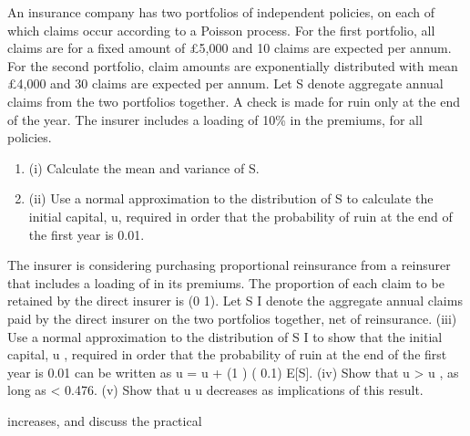 \documentclass[a4paper,12pt]{article}
\begin{document}
\item An insurance company has two portfolios of independent policies, on each of which claims occur according to a Poisson process. For the first portfolio, all claims are for a fixed amount of £5,000 and 10 claims are expected per annum. For the second
portfolio, claim amounts are exponentially distributed with mean £4,000 and 30
claims are expected per annum.
Let S denote aggregate annual claims from the two portfolios together.
A check is made for ruin only at the end of the year.
The insurer includes a loading of 10\% in the premiums, for all policies.
\begin{enumerate}
\item (i) Calculate the mean and variance of S. 
\item (ii) Use a normal approximation to the distribution of S to calculate the initial capital, u, required in order that the probability of ruin at the end of the first year is 0.01. 
\end{enumerate}
\item The insurer is considering purchasing proportional reinsurance from a reinsurer that includes a loading of in its premiums. The proportion of each claim to be retained by the direct insurer is (0
1).
Let S I denote the aggregate annual claims paid by the direct insurer on the two portfolios together, net of reinsurance.
(iii)
Use a normal approximation to the distribution of S I to show that the initial capital, u , required in order that the probability of ruin at the end of the first
year is 0.01 can be written as
u = u + (1
) (
0.1) E[S].
(iv) Show that u > u , as long as < 0.476.
(v) Show that u u decreases as
implications of this result.

increases, and discuss the practical
% 
% 
\end{document}
